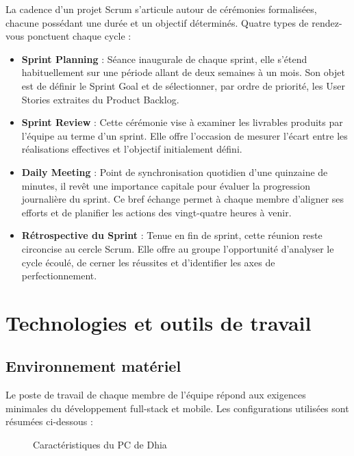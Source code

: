 La cadence d'un projet Scrum s'articule autour de cérémonies formalisées, chacune possédant une durée et un objectif déterminés. Quatre types de rendez-vous ponctuent chaque cycle :
\begin{itemize}
    \item \textbf{Sprint Planning} : Séance inaugurale de chaque sprint, elle s'étend habituellement sur une période allant de deux semaines à un mois. Son objet est de définir le Sprint Goal et de sélectionner, par ordre de priorité, les User Stories extraites du Product Backlog.
    \item \textbf{Sprint Review} : Cette cérémonie vise à examiner les livrables produits par l'équipe au terme d'un sprint. Elle offre l'occasion de mesurer l'écart entre les réalisations effectives et l'objectif initialement défini.
    \item \textbf{Daily Meeting} : Point de synchronisation quotidien d'une quinzaine de minutes, il revêt une importance capitale pour évaluer la progression journalière du sprint. Ce bref échange permet à chaque membre d'aligner ses efforts et de planifier les actions des vingt-quatre heures à venir.
    \item \textbf{Rétrospective du Sprint} : Tenue en fin de sprint, cette réunion reste circoncise au cercle Scrum. Elle offre au groupe l'opportunité d'analyser le cycle écoulé, de cerner les réussites et d'identifier les axes de perfectionnement.
\end{itemize}

\section{Technologies et outils de travail}

\subsection{Environnement matériel}
Le poste de travail de chaque membre de l'équipe répond aux exigences minimales du développement full-stack et mobile. Les configurations utilisées sont résumées ci-dessous :

\begin{figure}[H]
    \centering
    \caption{Caractéristiques du PC de Dhia}
    \label{fig:pc_dhia}
\end{figure}

